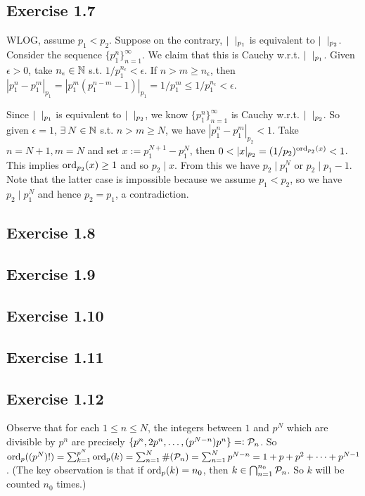 \documentclass[../Koblitz.tex]{subfiles}
\begin{document}
\subsection*{Exercise 1.7}

WLOG, assume $p_1<p_2$. Suppose on the contrary, $\snr_{p_1}$ is equivalent to $\snr_{p_2}$. Consider the sequence $\{p_1^n\}_{n=1}^\infty$. We claim that this is Cauchy w.r.t. $\snr_{p_1}$. Given $\epsilon>0$, take $n_\epsilon\in\mathbb{N}$ s.t. $1/p_1^{n_\epsilon}<\epsilon$. If $n>m\geq n_\epsilon$, then $|p_1^n-p_1^m|_{p_1} = |p_1^m(p_1^{n-m}-1)|_{p_1} = 1/p_1^m \leq 1/p_1^{n_\epsilon} < \epsilon$.

Since $\snr_{p_1}$ is equivalent to $\snr_{p_2}$, we know $\{p_1^n\}_{n=1}^\infty$ is Cauchy w.r.t. $\snr_{p_2}$. So given $\epsilon=1$, $\exists N\in\NN$ s.t. $n>m\geq N$, we have $|p_1^n-p_1^m|_{p_2}<1$. Take $n=N+1,m=N$ and set $x:=p_1^{N+1}-p_1^N$, then $0<|x|_{p_2} = (1/p_2)^{\ord_{p_2}(x)} < 1$. This implies $\operatorname{ord}_{p_2}(x) \geq1$ and so $p_2\mid x$. From this we have $p_2\mid p_1^N$ or $p_2\mid p_1-1$. Note that the latter case is impossible because we assume $p_1<p_2$, so we have $p_2\mid p_1^N$ and hence $p_2=p_1$, a contradiction.

\subsection*{Exercise 1.8}

\subsection*{Exercise 1.9}

\subsection*{Exercise 1.10}

\subsection*{Exercise 1.11}

\subsection*{Exercise 1.12}

Observe that for each $1\leq n\leq N$, the integers between $1$ and $p^N$ which are divisible by $p^n$ are precisely $\{p^n,2p^n,\ldots,(p^{N-n})p^n\}=:\mathcal{P}_n$. So $\operatorname{ord}_p((p^N)!) = \sum_{k=1}^{p^N} \operatorname{ord}_p(k) = \sum_{n=1}^N \#(\mathcal{P}_n) = \sum_{n=1}^N p^{N-n} = 1 + p + p^2 + \cdots + p^{N-1}$. (The key observation is that if $\operatorname{ord}_p(k)=n_0$, then $k\in \bigcap_{n=1}^{n_0} \mathcal{P}_n$. So $k$ will be counted $n_0$ times.)
\end{document}
